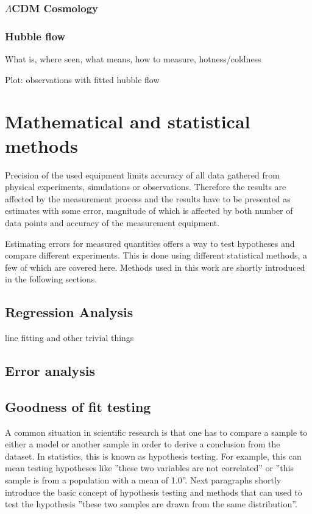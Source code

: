 \documentclass[english, oneside]{HYgradu}
\begin{document}
\subsection{$\Lambda$CDM Cosmology}


\subsection{Hubble flow}
What is, where seen, what means, how to measure, hotness/coldness

Plot: observations with fitted hubble flow


\chapter{Mathematical and statistical methods}
Precision of the used equipment limits accuracy of all data gathered from physical experiments, simulations or observations. Therefore the results are affected by the measurement process and the results have to be presented as estimates with some error, magnitude of which is affected by both number of data points and accuracy of the measurement equipment. \citep{bohm2010introduction}

Estimating errors for measured quantities offers a way to test hypotheses and compare different experiments\citep{bohm2010introduction}. This is done using different statistical methods, a few of which are covered here. Methods used in this work are shortly introduced in the following sections.

\section{Regression Analysis}
line fitting and other trivial things

\section{Error analysis}

\section{Goodness of fit testing}
A common situation in scientific research is that one has to compare a sample to either a model or another sample in order to derive a conclusion from the dataset. In statistics, this is known as hypothesis testing. For example, this can mean testing hypotheses like ''these two variables are not correlated'' or ''this sample is from a population with a mean of 1.0''. \citep{wall2003practical} Next paragraphs shortly introduce the basic concept of hypothesis testing and methods that can used to test the hypothesis ''these two samples are drawn from the same distribution''.
\end{document}
